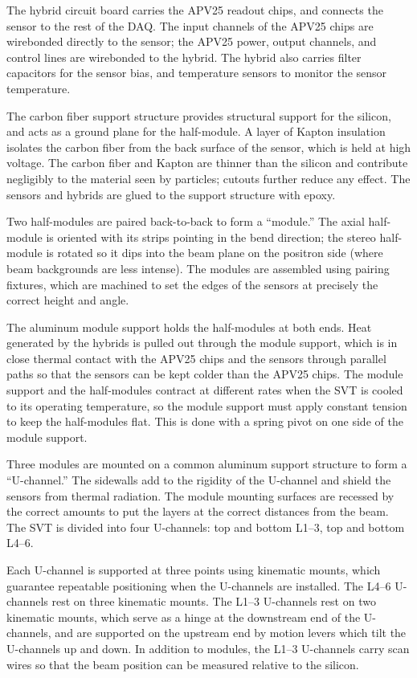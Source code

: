 The hybrid circuit board carries the APV25 readout chips, and connects the sensor to the rest of the DAQ.
The input channels of the APV25 chips are wirebonded directly to the sensor; the APV25 power, output channels, and control lines are wirebonded to the hybrid.
The hybrid also carries filter capacitors for the sensor bias, and temperature sensors to monitor the sensor temperature.

The carbon fiber support structure provides structural support for the silicon, and acts as a ground plane for the half-module.
A layer of Kapton insulation isolates the carbon fiber from the back surface of the sensor, which is held at high voltage.
The carbon fiber and Kapton are thinner than the silicon and contribute negligibly to the material seen by particles; cutouts further reduce any effect.
The sensors and hybrids are glued to the support structure with epoxy.

Two half-modules are paired back-to-back to form a ``module.''
The axial half-module is oriented with its strips pointing in the bend direction; the stereo half-module is rotated so it dips into the beam plane on the positron side (where beam backgrounds are less intense).
The modules are assembled using pairing fixtures, which are machined to set the edges of the sensors at precisely the correct height and angle.

The aluminum module support holds the half-modules at both ends.
Heat generated by the hybrids is pulled out through the module support, which is in close thermal contact with the APV25 chips and the sensors through parallel paths so that the sensors can be kept colder than the APV25 chips.
The module support and the half-modules contract at different rates when the SVT is cooled to its operating temperature, so the module support must apply constant tension to keep the half-modules flat.
This is done with a spring pivot on one side of the module support.

Three modules are mounted on a common aluminum support structure to form a ``U-channel.''
The sidewalls add to the rigidity of the U-channel and shield the sensors from thermal radiation.
The module mounting surfaces are recessed by the correct amounts to put the layers at the correct distances from the beam.
The SVT is divided into four U-channels: top and bottom L1--3, top and bottom L4--6.

Each U-channel is supported at three points using kinematic mounts, which guarantee repeatable positioning when the U-channels are installed.
The L4--6 U-channels rest on three kinematic mounts.
The L1--3 U-channels rest on two kinematic mounts, which serve as a hinge at the downstream end of the U-channels, and are supported on the upstream end by motion levers which tilt the U-channels up and down.
In addition to modules, the L1--3 U-channels carry scan wires so that the beam position can be measured relative to the silicon.

